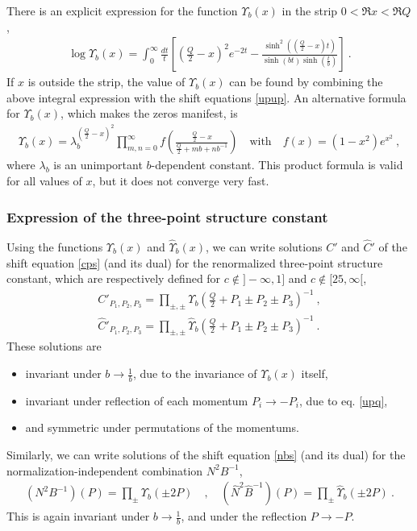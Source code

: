 \documentclass[12pt, a4paper, notitlepage, twoside]{report}
\numberwithin{equation}{section}
\theoremstyle{break}
\begin{document}
There is an explicit expression for the function $\Upsilon_b(x)$ in the strip $0<\Re x<\Re Q$, 
\begin{align}
 \log\Upsilon_b(x) = \int_0^\infty \frac{dt}{t} \left[\left(\tfrac{Q}{2}-x\right)^2 e^{-2t} -\frac{\sinh^2\left(\left(\frac{Q}{2}-x\right)\!t\right)}{\sinh (bt)\sinh\left(\frac{t}{b}\right)}\right]\ .
\label{lup}
\end{align}
If $x$ is outside the strip, the value of $\Upsilon_b(x)$ can be found by combining the above integral expression with the shift equations \eqref{upup}.
An alternative formula for $\Upsilon_b(x)$, which makes the zeros manifest, is 
\begin{align}
 \Upsilon_b(x) = \lambda_b^{(\frac{Q}{2}-x)^2}\prod_{m,n=0}^\infty f\left(\frac{\frac{Q}{2}-x}{\frac{Q}{2}+mb+nb^{-1}}\right) \quad \text{with} \quad f(x)=(1-x^2)e^{x^2}\ ,
\end{align}
where $\lambda_b$ is an unimportant $b$-dependent constant.
This product formula is valid for all values of $x$, but it does not converge very fast.

\subsubsection{Expression of the three-point structure constant}

Using the functions $\Upsilon_b(x)$ and $\hat\Upsilon_b(x)$, we can write solutions $C'$ and $\hat C'$ of the shift equation \eqref{cps} (and its dual) for the renormalized three-point structure constant, which are respectively defined for $c\notin ]-\infty, 1]$ and $c\notin [25,\infty[$,
\begin{align}
 \boxed{C'_{P_1,P_2,P_3} = \prod_{\pm,\pm} \Upsilon_b\left(\tfrac{Q}{2}+P_1\pm P_2 \pm P_3\right)^{-1} }\ ,
 \label{cp}
 \\
 \boxed{\hat C'_{P_1,P_2,P_3} = \prod_{\pm,\pm} \hat\Upsilon_b\left(\tfrac{Q}{2}+P_1\pm P_2 \pm P_3\right)^{-1}}\ .
 \label{hcp}
\end{align}
These solutions are 
\begin{itemize}
 \item invariant under $b\to \frac{1}{b}$, due to the invariance of $\Upsilon_b(x)$ itself,
 \item invariant under reflection of each momentum $P_i\to -P_i$, due to eq. \eqref{upq},
 \item and symmetric under permutations of the momentums.
\end{itemize}
Similarly, we can write solutions of the shift equation \eqref{nbs} (and its dual) for the normalization-independent combination $N^2B^{-1}$,
\begin{align}
 \boxed{\left(N^2B^{-1}\right)(P) =\prod_\pm \Upsilon_b(\pm 2P)} \quad , \quad \boxed{\left(\hat N^2\hat B^{-1}\right)(P) = \prod_\pm \hat\Upsilon_b(\pm 2P) } \ .
\end{align}
This is again invariant under $b\to \frac{1}{b}$, and under the reflection $P\to -P$.
\end{document}

